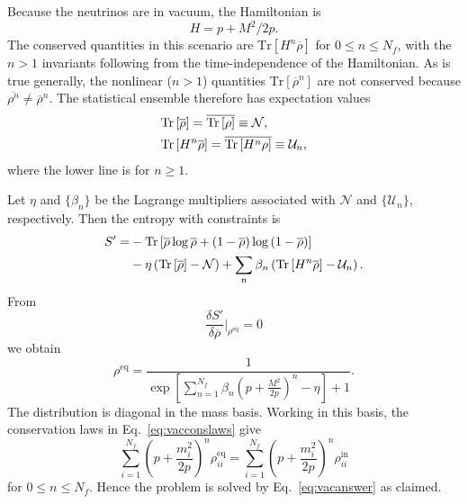 \documentclass[aps,prd,twocolumn,groupedaddress]{revtex4-2}
\begin{document}
Because the neutrinos are in vacuum, the Hamiltonian is
\begin{equation}
H = p + M^2 / 2p.
\end{equation}
The conserved quantities in this scenario are $\textrm{Tr}\left[ H^n \overline{\rho} \right]$ for $0 \leq n \leq N_f$, with the $n > 1$ invariants following from the time-independence of the Hamiltonian. As is true generally, the nonlinear ($n > 1$) quantities $\textrm{Tr}[\overline{\rho}^n]$ are not conserved because $\overline{\rho^n} \neq \overline{\rho}^n$. The statistical ensemble therefore has expectation values
\begin{align}
&\textrm{Tr} \left[ \overline{\rho} \right] = \overline{\textrm{Tr}\left[ \rho \right]} \equiv \mathcal{N}, \notag \\
&\textrm{Tr}\left[ H^n \overline{\rho} \right] = \overline{\textrm{Tr}\left[ H^n \rho \right]} \equiv \mathcal{U}_n, \label{eq:vacconslaws}
\end{align}
where the lower line is for $n \geq 1$.

Let $\eta$ and $\lbrace \beta_n \rbrace$ be the Lagrange multipliers associated with $\mathcal{N}$ and $\lbrace \mathcal{U}_n \rbrace$, respectively. Then the entropy with constraints is
\begin{align}
S' = &- \textrm{Tr} \left[ \overline{\rho} \log \overline{\rho} + \left( 1 - \overline{\rho} \right) \log \left( 1 - \overline{\rho} \right) \right] \notag \\
&- \eta \left( \textrm{Tr} \left[ \overline{\rho} \right] - \mathcal{N} \right) + \sum_n \beta_n \left( \textrm{Tr} \left[ H^n \overline{\rho} \right] - \mathcal{U}_n \right).
\end{align}
From
\begin{equation}
\frac{\delta S'}{\delta \overline{\rho}} \bigg|_{\rho^\textrm{eq}} = 0
\end{equation}
we obtain
\begin{equation}
\rho^\textrm{eq} = \frac{1}{\exp\left[ \sum_{n=1}^{N_f} \beta_n \left( p + \frac{M^2}{2p} \right)^n  - \eta\right] + 1}. \label{eq:vaceq}
\end{equation}
The distribution is diagonal in the mass basis. Working in this basis, the conservation laws in Eq.~\eqref{eq:vacconslaws} give
\begin{equation}
\sum_{i=1}^{N_f} \left( p + \frac{m_i^2}{2p} \right)^n \rho_{ii}^\textrm{eq} = \sum_{i=1}^{N_f} \left( p + \frac{m_i^2}{2p} \right)^n \rho_{ii}^\textrm{in}
\end{equation}
for $0 \leq n \leq N_f$. Hence the problem is solved by Eq.~\eqref{eq:vacanswer} as claimed.
\end{document}
